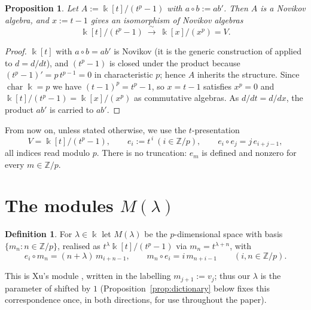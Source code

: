 \documentclass[11pt,reqno]{amsart}
\theoremstyle{plain}
\newtheorem{proposition}[theorem]{Proposition}
\theoremstyle{definition}
\newtheorem{definition}[theorem]{Definition}
\newcommand{\kk}{\Bbbk}
\newcommand{\Zp}{\mathbb{Z}/p}
\begin{document}
\begin{proposition}\label{prop:iso-alg}
Let $A:=\kk[t]/(t^p-1)$ with $a\circ b:=ab'$. Then $A$ is a Novikov algebra, and $x:=t-1$
gives an isomorphism of Novikov algebras
\[
\kk[t]/(t^p-1)\ \xrightarrow{\ \sim\ }\ \kk[x]/(x^p)=V .
\]
\end{proposition}

\begin{proof}
$\kk[t]$ with $a\circ b=ab'$ is Novikov (it is the generic construction of
\cite{GelfandDorfman} applied to $d=d/dt$), and $(t^p-1)$ is closed under the product because
$(t^p-1)'=p\,t^{p-1}=0$ in characteristic $p$; hence $A$ inherits the structure. Since
$\operatorname{char}\kk=p$ we have $(t-1)^p=t^p-1$, so $x=t-1$ satisfies $x^p=0$ and
$\kk[t]/(t^p-1)=\kk[x]/(x^p)$ as commutative algebras. As $d/dt=d/dx$, the product $ab'$ is
carried to $ab'$.
\end{proof}

From now on, unless stated otherwise, we use the $t$-presentation
\[
V=\kk[t]/(t^p-1),\qquad e_i:=t^{\,i}\ (i\in\Zp),\qquad e_i\circ e_j=j\,e_{i+j-1},
\]
all indices read modulo $p$. There is no truncation: $e_m$ is defined and nonzero for every
$m\in\Zp$.

\section{The modules $M(\lambda)$}\label{sec:mod}

\begin{definition}\label{def:M}
For $\lambda\in\kk$ let $M(\lambda)$ be the $p$-dimensional space with basis
$\{m_n:n\in\Zp\}$, realised as $t^{\lambda}\kk[t]/(t^p-1)$ via $m_n=t^{\lambda+n}$, with
\begin{equation}
e_i\circ m_n=(n+\lambda)\,m_{i+n-1},\qquad m_n\circ e_i=i\,m_{n+i-1}\qquad(i,n\in\Zp).
\label{eq:action}
\end{equation}
\end{definition}

This is Xu's module \cite{Xu1996}, written in the labelling $m_{j+1}:=v_j$; thus our
$\lambda$ is the parameter of \cite{Xu1996} shifted by $1$ (Proposition~\ref{prop:dictionary}
below fixes this correspondence once, in both directions, for use throughout the paper).
\end{document}
